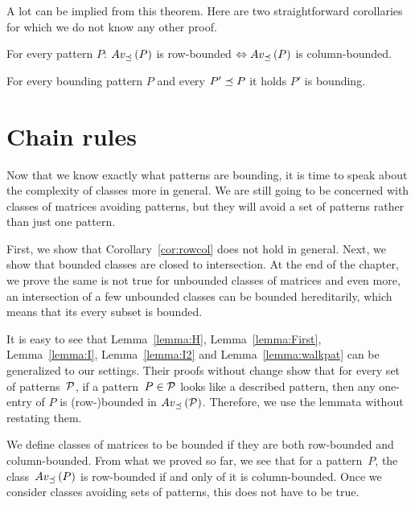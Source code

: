 A lot can be implied from this theorem. Here are two straightforward corollaries for which we do not know any other proof.

\begin{cor}
\label{cor:rowcol}
For every pattern $P$: $Av_{\preceq}\left(P\right)$ is row-bounded $\Leftrightarrow Av_{\preceq}\left(P\right)$ is column-bounded.
\end{cor}

\begin{cor}
For every bounding pattern $P$ and every $P'\preceq P$ it holds $P'$ is bounding.
\end{cor}

\section{Chain rules}
Now that we know exactly what patterns are bounding, it is time to speak about the complexity of classes more in general. We are still going to be concerned with classes of matrices avoiding patterns, but they will avoid a set of patterns rather than just one pattern.

First, we show that Corollary~\ref{cor:rowcol} does not hold in general. Next, we show that bounded classes are closed to intersection. At the end of the chapter, we prove the same is not true for unbounded classes of matrices and even more, an intersection of a few unbounded classes can be bounded hereditarily, which means that its every subset is bounded.

It is easy to see that Lemma~\ref{lemma:H}, Lemma~\ref{lemma:First}, Lemma~\ref{lemma:I}, Lemma~\ref{lemma:I2} and Lemma~\ref{lemma:walkpat} can be generalized to our settings. Their proofs without change show that for every set of patterns~$\mathcal{P}$, if a pattern~$P\in\mathcal{P}$ looks like a described pattern, then any one-entry of $P$ is (row-)bounded in $Av_{\preceq}\left(\mathcal{P}\right)$. Therefore, we use the lemmata without restating them.

We define classes of matrices to be bounded if they are both row-bounded and column-bounded. From what we proved so far, we see that for a pattern~$P$, the class~$Av_{\preceq}\left(P\right)$ is row-bounded if and only of it is column-bounded. Once we consider classes avoiding sets of patterns, this does not have to be true.


